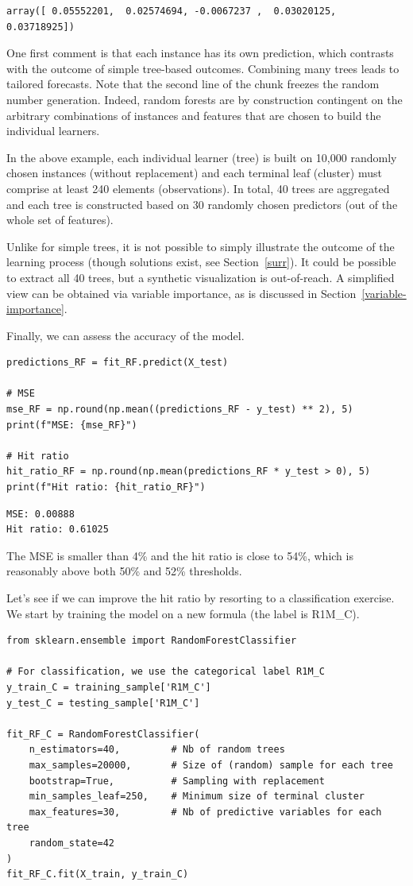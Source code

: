 \begin{verbatim}
array([ 0.05552201,  0.02574694, -0.0067237 ,  0.03020125,  0.03718925])
\end{verbatim}

One first comment is that each instance has its own prediction, which contrasts with the outcome of simple tree-based outcomes. Combining many trees leads to tailored forecasts. Note that the second line of the chunk freezes the random number generation. Indeed, random forests are by construction contingent on the arbitrary combinations of instances and features that are chosen to build the individual learners.

In the above example, each individual learner (tree) is built on 10,000 randomly chosen instances (without replacement) and each terminal leaf (cluster) must comprise at least 240 elements (observations). In total, 40 trees are aggregated and each tree is constructed based on 30 randomly chosen predictors (out of the whole set of features).

Unlike for simple trees, it is not possible to simply illustrate the outcome of the learning process (though solutions exist, see Section~\ref{surr}). It could be possible to extract all 40 trees, but a synthetic visualization is out-of-reach. A simplified view can be obtained via variable importance, as is discussed in Section~\ref{variable-importance}.

Finally, we can assess the accuracy of the model.

\begin{verbatim}
predictions_RF = fit_RF.predict(X_test)

# MSE
mse_RF = np.round(np.mean((predictions_RF - y_test) ** 2), 5)
print(f"MSE: {mse_RF}")

# Hit ratio
hit_ratio_RF = np.round(np.mean(predictions_RF * y_test > 0), 5)
print(f"Hit ratio: {hit_ratio_RF}")
\end{verbatim}

\begin{verbatim}
MSE: 0.00888
Hit ratio: 0.61025
\end{verbatim}

The MSE is smaller than 4\% and the hit ratio is close to 54\%, which is reasonably above both 50\% and 52\% thresholds.

Let's see if we can improve the hit ratio by resorting to a classification exercise. We start by training the model on a new formula (the label is R1M\_C).

\begin{verbatim}
from sklearn.ensemble import RandomForestClassifier

# For classification, we use the categorical label R1M_C
y_train_C = training_sample['R1M_C']
y_test_C = testing_sample['R1M_C']

fit_RF_C = RandomForestClassifier(
    n_estimators=40,         # Nb of random trees
    max_samples=20000,       # Size of (random) sample for each tree
    bootstrap=True,          # Sampling with replacement
    min_samples_leaf=250,    # Minimum size of terminal cluster
    max_features=30,         # Nb of predictive variables for each tree
    random_state=42
)
fit_RF_C.fit(X_train, y_train_C)
\end{verbatim}

